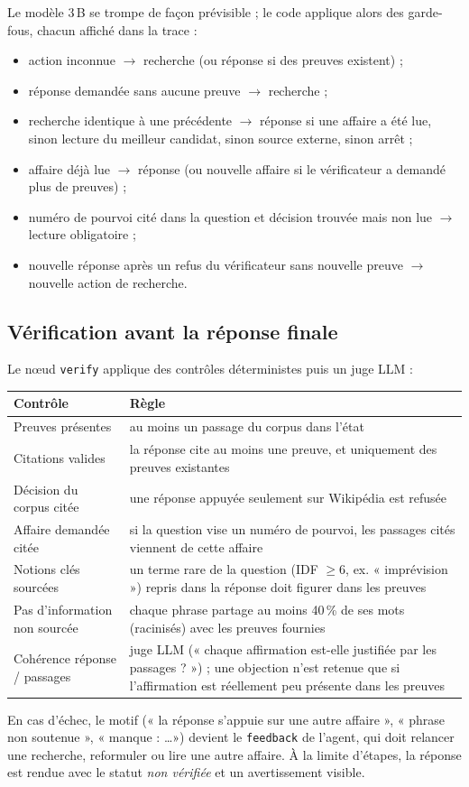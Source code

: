 \documentclass[11pt,a4paper]{article}
\begin{document}
Le modèle 3\,B se trompe de façon prévisible ; le code applique alors des garde-fous, chacun affiché
dans la trace :
\begin{itemize}
  \item action inconnue $\rightarrow$ recherche (ou réponse si des preuves existent) ;
  \item réponse demandée sans aucune preuve $\rightarrow$ recherche ;
  \item recherche identique à une précédente $\rightarrow$ réponse si une affaire a été lue, sinon lecture du meilleur candidat, sinon source externe, sinon arrêt ;
  \item affaire déjà lue $\rightarrow$ réponse (ou nouvelle affaire si le vérificateur a demandé plus de preuves) ;
  \item numéro de pourvoi cité dans la question et décision trouvée mais non lue $\rightarrow$ lecture obligatoire ;
  \item nouvelle réponse après un refus du vérificateur sans nouvelle preuve $\rightarrow$ nouvelle action de recherche.
\end{itemize}

\subsection{Vérification avant la réponse finale}
Le nœud \texttt{verify} applique des contrôles déterministes puis un juge LLM :
\begin{center}\small
\begin{tabularx}{\textwidth}{@{}l X@{}}
\toprule
Contrôle & Règle \\ \midrule
Preuves présentes & au moins un passage du corpus dans l'état \\
Citations valides & la réponse cite au moins une preuve, et uniquement des preuves existantes \\
Décision du corpus citée & une réponse appuyée seulement sur Wikipédia est refusée \\
Affaire demandée citée & si la question vise un numéro de pourvoi, les passages cités viennent de cette affaire \\
Notions clés sourcées & un terme rare de la question (IDF $\geq 6$, ex. « imprévision ») repris dans la réponse doit figurer dans les preuves \\
Pas d'information non sourcée & chaque phrase partage au moins 40\,\% de ses mots (racinisés) avec les preuves fournies \\
Cohérence réponse / passages & juge LLM (« chaque affirmation est-elle justifiée par les passages ? ») ; une objection n'est retenue que si l'affirmation est réellement peu présente dans les preuves \\
\bottomrule
\end{tabularx}
\end{center}
En cas d'échec, le motif (« la réponse s'appuie sur une autre affaire », « phrase non soutenue »,
« manque : \ldots ») devient le \texttt{feedback} de l'agent, qui doit relancer une recherche,
reformuler ou lire une autre affaire. À la limite d'étapes, la réponse est rendue avec le statut
\emph{non vérifiée} et un avertissement visible.
\end{document}
